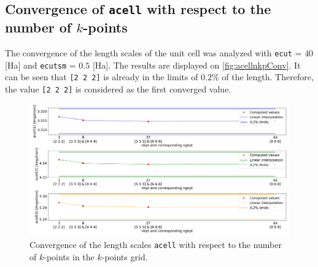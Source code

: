 \documentclass[11pt,a4paper]{article}
\begin{document}
\subsection{Convergence of \texttt{acell} with respect to the number of $k$-points}
The convergence of the length scales of the unit cell was analyzed with \texttt{ecut} = $40$ [Ha] and \texttt{ecutsm} = $0.5$ [Ha]. The results are displayed on \autoref{fig:acellnkpConv}. It can be seen that \texttt{[2 2 2]} is already in the limits of $0.2\%$ of the length. Therefore, the value \texttt{[2 2 2]} is considered as the first converged value.
\begin{figure}
\centering
\includegraphics[width=\textwidth]{images/acellNgkpt.png}
\caption{Convergence of the length scales \texttt{acell} with respect to the number of $k$-points in the $k$-points grid.}
\label{fig:acellnkpConv}
\end{figure}
\end{document}
